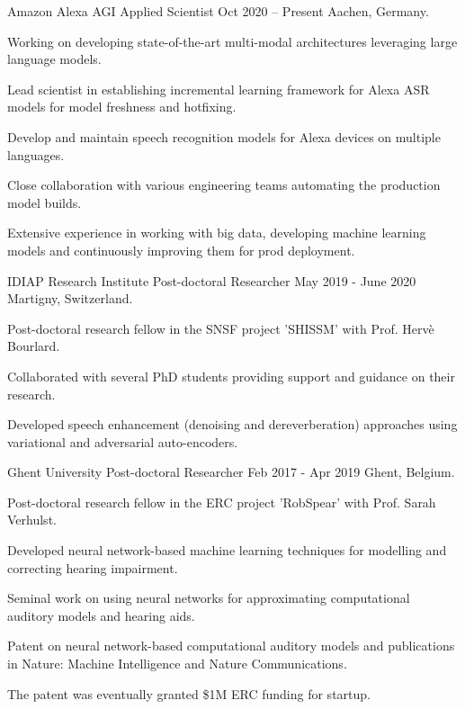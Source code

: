 \documentclass[]{awesome-cv}
\begin{document}
\begin{cventries}
	\cventry
	{Amazon Alexa AGI}
	{Applied Scientist}
	{Oct 2020 – Present}
	{Aachen, Germany.}
	{\begin{cvitems}
		\item {Working on developing state-of-the-art multi-modal architectures leveraging large language models.}
		\item {Lead scientist in establishing incremental learning framework for Alexa ASR models for model freshness and hotfixing.}
		\item {Develop and maintain speech recognition models for Alexa devices on multiple languages.}
		\item {Close collaboration with various engineering teams automating the production model builds.}
		\item {Extensive experience in working with big data, developing machine learning models and continuously improving them for prod deployment.}
		\end{cvitems}}
	\cventry
	{IDIAP Research Institute}
	{Post-doctoral Researcher}
	{May 2019 - June 2020}
	{Martigny, Switzerland.}
	{\begin{cvitems}
		\item{Post-doctoral research fellow in the SNSF project 'SHISSM' with Prof. Herv\`{e} Bourlard.}
		\item {Collaborated with several PhD students providing support and guidance on their research.}
		\item {Developed speech enhancement (denoising and dereverberation) approaches using variational and adversarial auto-encoders.}
		\end{cvitems}}
	\cventry
	{Ghent University}
	{Post-doctoral Researcher}
	{Feb 2017 - Apr 2019}
	{Ghent, Belgium.}
	{\begin{cvitems}
		\item {Post-doctoral research fellow in the ERC project 'RobSpear' with Prof. Sarah Verhulst.}
		\item {Developed neural network-based machine learning techniques for modelling and correcting hearing impairment.}
		\item {Seminal work on using neural networks for approximating computational auditory models and hearing aids.}
		\item {Patent on neural network-based computational auditory models and publications in Nature: Machine Intelligence and Nature Communications.}
		\item {The patent was eventually granted \$1M ERC funding for startup.}

\end{cvitems}}
\end{cventries}
\end{document}
